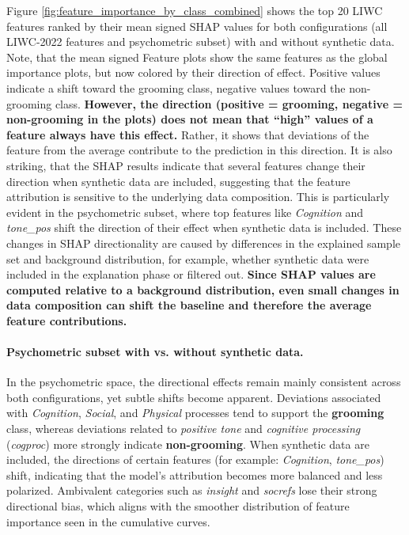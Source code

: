 Figure \ref{fig:feature_importance_by_class_combined} shows the top 20 LIWC features ranked by their mean signed SHAP values for both configurations (all LIWC-2022 features and psychometric subset) with and without synthetic data. Note, that the mean signed Feature plots show the same features as the global importance plots, but now colored by their direction of effect. Positive values indicate a shift toward the grooming class, negative values toward the non-grooming class. \textbf{However, the direction (positive = grooming, negative = non-grooming in the plots) does not mean that “high” values of a feature always have this effect.} Rather, it shows that deviations of the feature from the average contribute to the prediction in this direction. It is also striking, that the SHAP results indicate that several features change their direction when synthetic data are included, suggesting that the feature attribution is sensitive to the underlying data composition. This is particularly evident in the psychometric subset, where top features like \textit{Cognition} and \textit{tone\_pos} shift the direction of their effect when synthetic data is included. These changes in SHAP directionality are caused by differences in the explained sample set and background distribution, for example, whether synthetic data were included in the explanation phase or filtered out. \textbf{Since SHAP values are computed relative to a background distribution, even small changes in data composition can shift the baseline and therefore the average feature contributions.} 


\paragraph{Psychometric subset with vs. without synthetic data.}
In the psychometric space, the directional effects remain mainly consistent across both configurations, yet subtle shifts become apparent. Deviations associated with \emph{Cognition}, \emph{Social}, and \emph{Physical} processes tend to support the \textbf{grooming} class, whereas deviations related to \emph{positive tone} and \emph{cognitive processing} (\textit{cogproc}) more strongly indicate \textbf{non-grooming}. When synthetic data are included, the directions of certain features (for example: \textit{Cognition}, \textit{tone\_pos}) shift, indicating that the model’s attribution becomes more balanced and less polarized. Ambivalent categories such as \textit{insight} and \textit{socrefs} lose their strong directional bias, which aligns with the smoother distribution of feature importance seen in the cumulative curves. 


